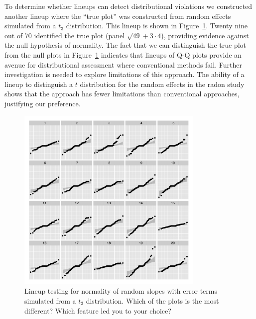 \documentclass[12pt]{article} %
\newcommand{\hhnote}[1]{\todo[inline,color=orange!40]{#1}}
\begin{document}
To determine whether lineups can detect distributional violations we constructed another lineup where the ``true plot'' was constructed from random effects simulated from a $t_3$ distribution. This lineup is shown in Figure~\ref{fig:qqlineup-t}. Twenty nine out of 70 identified the true plot (panel $\sqrt{49} + 3\cdot4$), providing evidence against the null hypothesis of normality.  
 The fact that we can distinguish the true plot from the null plots in Figure~\ref{fig:qqlineup-t} indicates that lineups of Q-Q plots provide an avenue for distributional assessment where conventional methods fail. Further investigation is needed to explore limitations of this approach.%
 The ability of a lineup to distinguish a $t$ distribution for the random effects in the radon study shows that the approach has fewer limitations than conventional approaches, justifying our preference.


\begin{figure}
	\centering
	\includegraphics[width=0.8\textwidth]{radontranef-19.pdf}
	\caption{\label{fig:qqlineup-t} Lineup  testing for normality of random slopes with error terms simulated from a $t_3$ distribution. Which of the plots is the most different? Which feature led you to your choice?}
\end{figure}
\end{document}
